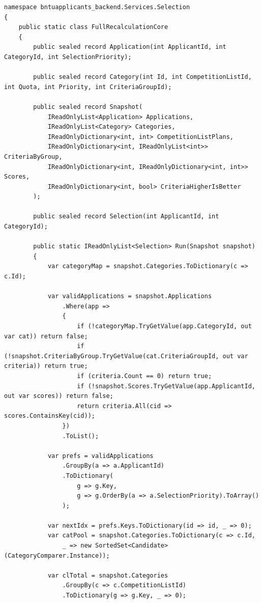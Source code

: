 \begin{lstlisting}[style=csharpstyle]
namespace bntuapplicants_backend.Services.Selection
{
    public static class FullRecalculationCore
    {
        public sealed record Application(int ApplicantId, int CategoryId, int SelectionPriority);

        public sealed record Category(int Id, int CompetitionListId, int Quota, int Priority, int CriteriaGroupId);

        public sealed record Snapshot(
            IReadOnlyList<Application> Applications,
            IReadOnlyList<Category> Categories,
            IReadOnlyDictionary<int, int> CompetitionListPlans,
            IReadOnlyDictionary<int, IReadOnlyList<int>> CriteriaByGroup,
            IReadOnlyDictionary<int, IReadOnlyDictionary<int, int>> Scores,
            IReadOnlyDictionary<int, bool> CriteriaHigherIsBetter
        );

        public sealed record Selection(int ApplicantId, int CategoryId);

        public static IReadOnlyList<Selection> Run(Snapshot snapshot)
        {
            var categoryMap = snapshot.Categories.ToDictionary(c => c.Id);

            var validApplications = snapshot.Applications
                .Where(app =>
                {
                    if (!categoryMap.TryGetValue(app.CategoryId, out var cat)) return false;
                    if (!snapshot.CriteriaByGroup.TryGetValue(cat.CriteriaGroupId, out var criteria)) return true;
                    if (criteria.Count == 0) return true;
                    if (!snapshot.Scores.TryGetValue(app.ApplicantId, out var scores)) return false;
                    return criteria.All(cid => scores.ContainsKey(cid));
                })
                .ToList();

            var prefs = validApplications
                .GroupBy(a => a.ApplicantId)
                .ToDictionary(
                    g => g.Key,
                    g => g.OrderBy(a => a.SelectionPriority).ToArray()
                );

            var nextIdx = prefs.Keys.ToDictionary(id => id, _ => 0);
            var catPool = snapshot.Categories.ToDictionary(c => c.Id,
                _ => new SortedSet<Candidate>(CategoryComparer.Instance));

            var clTotal = snapshot.Categories
                .GroupBy(c => c.CompetitionListId)
                .ToDictionary(g => g.Key, _ => 0);


\end{lstlisting}
